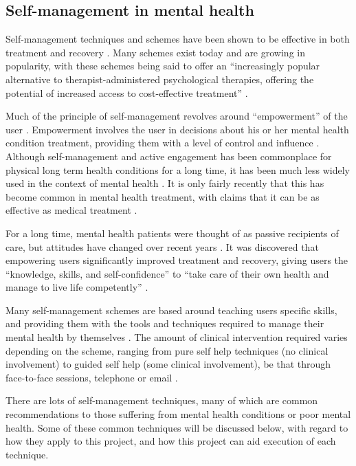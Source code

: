 \documentclass[11pt,openright,a4paper]{report}
\begin{document}
\subsection{Self-management in mental health}
Self-management techniques and schemes have been shown to be effective in both treatment \parencite{wrapstudy} and recovery \parencite{selfmanagementrelapse}. Many schemes exist today and are growing in popularity, with these schemes being said to offer an \enquote{increasingly popular alternative to therapist-administered psychological therapies, offering the potential of increased access to cost-effective treatment} \parencite{selfhelpanxiety}.

Much of the principle of self-management revolves around \enquote{empowerment} of the user \parencite{whoselfmanagement}. Empowerment involves the user in decisions about his or her mental health condition treatment, providing them with a level of control and influence \parencite{whoempowerment}. Although self-management and active engagement has been commonplace for physical long term health conditions for a long time, it has been much less widely used in the context of mental health \parencite{whoselfmanagement}. It is only fairly recently that this has become common in mental health treatment, with claims that it can be as effective as medical treatment \parencite{mhfselfmanagement}.

For a long time, mental health patients were thought of as passive recipients of care, but attitudes have changed over recent years \parencite{cpselfmanagement}. It was discovered that empowering users significantly improved treatment and recovery, giving users the \enquote{knowledge, skills, and self-confidence} to \enquote{take care of their own health and manage to live life competently} \parencite{vahdatpatientinvolvement}.

Many self-management schemes are based around teaching users specific skills, and providing them with the tools and techniques required to manage their mental health by themselves \parencite{selfmanagementuk}. The amount of clinical intervention required varies depending on the scheme, ranging from pure self help techniques (no clinical involvement) to guided self help (some clinical involvement), be that through face-to-face sessions, telephone or email \parencite{selfhelpanxiety}.

There are lots of self-management techniques, many of which are common recommendations to those suffering from mental health conditions or poor mental health. Some of these common techniques will be discussed below, with regard to how they apply to this project, and how this project can aid execution of each technique.
\end{document}
